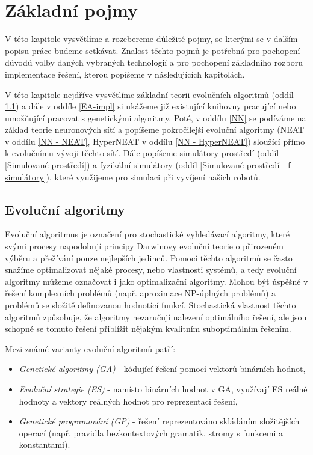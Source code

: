 \chapter{Základní pojmy}

V této kapitole vysvětlíme a rozebereme důležité pojmy, se kterými se v dalším
popisu práce budeme setkávat. Znalost těchto pojmů je potřebná pro pochopení
důvodů volby daných vybraných technologií a pro pochopení základního rozboru
implementace řešení, kterou popíšeme v následujících kapitolách.

V této kapitole nejdříve vysvětlíme základní teorii evolučních algoritmů (oddíl
\ref{Evoluční algoritmy}) a dále v oddíle \ref{EA-impl} si ukážeme již
existující knihovny pracující nebo umožňující pracovat s genetickými algoritmy.
Poté, v oddílu \ref{NN} se podíváme na základ teorie neuronových sítí a
popíšeme pokročilejší evoluční algoritmy (NEAT v oddílu \ref{NN - NEAT},
HyperNEAT v oddílu \ref{NN - HyperNEAT}) sloužící přímo k evolučnímu vývoji
těchto sítí. Dále popíšeme simulátory prostředí (oddíl \ref{Simulované
prostředí}) a fyzikální simulátory (oddíl \ref{Simulované prostředí - f
simulátory}), které využijeme pro simulaci při vyvíjení našich robotů.

\section{Evoluční algoritmy} \label{Evoluční algoritmy}

Evoluční algoritmus je označení pro stochastické vyhledávací algoritmy, které
svými procesy napodobují principy Darwinovy evoluční teorie o přirozeném výběru
a přežívání pouze nejlepších jedinců. Pomocí těchto algoritmů se často snažíme
optimalizovat nějaké procesy, nebo vlastnosti systémů, a tedy evoluční
algoritmy můžeme označovat i jako optimalizační algoritmy. Mohou být úspěšné v
řešení komplexních problémů (např. aproximace NP-úplných problémů) a problémů
se složitě definovanou hodnotící funkcí. Stochastická vlastnost těchto
algoritmů způsobuje, že algoritmy nezaručují nalezení optimálního řešení, ale
jsou schopné se tomuto řešení přiblížit nějakým kvalitním suboptimálním
řešením.

Mezi známé varianty evoluční algoritmů patří:
\begin{itemize}
    \item \emph{Genetické algoritmy (GA)} - kódující řešení pomocí vektorů binárních
        hodnot,
    \item \emph{Evoluční strategie (ES)} - namísto binárních hodnot v GA,
        využívají ES reálné hodnoty a vektory reálných hodnot pro reprezentaci
        řešení, 
    \item \emph{Genetické programování (GP)} - řešení reprezentováno skládáním
        složitějších operací (např. pravidla bezkontextových gramatik, stromy s
        funkcemi a konstantami).
\end{itemize}

